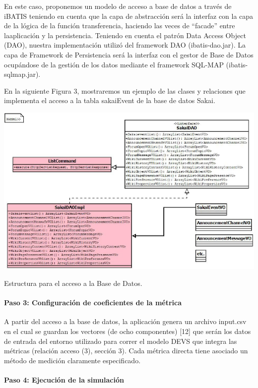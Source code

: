 En este caso, proponemos un modelo de acceso a base de datos a través de iBATIS 
teniendo en cuenta que la capa de abstracción será la interfaz con la capa de la
lógica de la función transferencia, haciendo las veces de “facade” entre
laaplicación y la persistencia. Teniendo en cuenta el patrón Data Access Object
(DAO), nuestra implementación  utilizó  del framework DAO (ibatis-dao.jar). La
capa de Framework de Persistencia será la interfaz con el gestor de Base de
Datos ocupándose de la gestión de los datos mediante el framework
SQL-MAP (ibatis-sqlmap.jar).

En la siguiente Figura 3, mostraremos un ejemplo de  las clases y relaciones que
implementa el acceso a la tabla sakaiEvent de la base de datos Sakai.


\begin{center}
 \includegraphics[width=5 in,totalheight=4 in] {Ch9/f14}
\end{center}
\caption{Estructura para el acceso a la Base de Datos.}


\paragraph{Paso 3: Configuración de coeficientes de la métrica}


A partir del acceso a la base de datos, la aplicación genera un archivo
input.csv en el cual se guardan los vectores (de ocho componentes) [12] que
serán los datos de entrada del entorno utilizado para correr el modelo DEVS que
integra las métricas (relación acceso (3), sección 3). Cada métrica directa
tiene asociado un método de medición claramente especificado.


\paragraph{Paso 4: Ejecución de la simulación}


